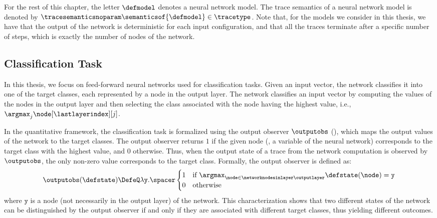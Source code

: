 For the rest of this chapter, the letter $\defmodel$ denotes a neural network model. The trace semantics of a neural network model is denoted by $\tracesemanticsnoparam\semanticsof{\defmodel}\in\tracetype$.
Note that, for the models we consider in this thesis, we have that the output of the network is deterministic for each input configuration, and that all the traces terminate after a specific number of steps, which is exactly the number of nodes of the network.

\subsection{Classification Task}

In this thesis, we focus on feed-forward neural networks used for classification tasks. Given an input vector, the network classifies it into one of the target classes, each represented by a node in the output layer. The network classifies an input vector by computing the values of the nodes in the output layer and then selecting the class associated with the node having the highest value, i.e., $\argmax_{j} \node[\lastlayerindex][j]$.

In the quantitative framework, the classification task is formalized using the output observer $\outputobs$ (), which maps the output values of the network to the target classes. The output observer returns $1$ if the given node (\ie, a variable of the neural network) corresponds to the target class with the highest value, and $0$ otherwise. Thus, when the output state of a trace from the network computation is observed by $\outputobs$, the only non-zero value corresponds to the target class. Formally, the output observer is defined as:
\begin{align*}
\outputobs(\defstate) \DefeQ \lambda \texttt{y}.\spacer
\begin{cases}
1 & \text{if } \argmax_{\node \in\networknodesinlayer\outputlayer} \defstate(\node) = \texttt{y} \\
0 & \text{otherwise}
\end{cases}
\end{align*}
where $\texttt{y}$ is a node (not necessarily in the output layer) of the network.
This characterization shows that two different states of the network can be distinguished by the output observer if and only if they are associated with different target classes, thus yielding different outcomes.

